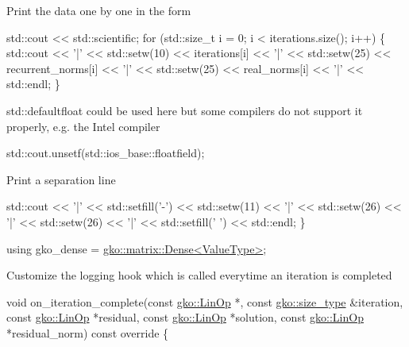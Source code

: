 Print the data one by one in the form


\begin{DoxyCode}
std::cout << std::scientific;
\textcolor{keywordflow}{for} (std::size\_t i = 0; i < iterations.size(); i++) \{
    std::cout << \textcolor{charliteral}{'|'} << std::setw(10) << iterations[i] << \textcolor{charliteral}{'|'}
              << std::setw(25) << recurrent\_norms[i] << \textcolor{charliteral}{'|'}
              << std::setw(25) << real\_norms[i] << \textcolor{charliteral}{'|'} << std::endl;
\}
\end{DoxyCode}


std\+::defaultfloat could be used here but some compilers do not support it properly, e.\+g. the Intel compiler


\begin{DoxyCode}
std::cout.unsetf(std::ios\_base::floatfield);
\end{DoxyCode}


Print a separation line


\begin{DoxyCode}
    std::cout << \textcolor{charliteral}{'|'} << std::setfill(\textcolor{charliteral}{'-'}) << std::setw(11) << \textcolor{charliteral}{'|'}
              << std::setw(26) << \textcolor{charliteral}{'|'} << std::setw(26) << \textcolor{charliteral}{'|'}
              << std::setfill(\textcolor{charliteral}{' '}) << std::endl;
\}

\textcolor{keyword}{using} gko\_dense = \hyperlink{classgko_1_1matrix_1_1Dense}{gko::matrix::Dense<ValueType>};
\end{DoxyCode}


Customize the logging hook which is called everytime an iteration is completed


\begin{DoxyCode}
\textcolor{keywordtype}{void} on\_iteration\_complete(\textcolor{keyword}{const} \hyperlink{classgko_1_1LinOp}{gko::LinOp} *,
                           \textcolor{keyword}{const} \hyperlink{namespacegko_a6e5c95df0ae4e47aab2f604a22d98ee7}{gko::size\_type} &iteration,
                           \textcolor{keyword}{const} \hyperlink{classgko_1_1LinOp}{gko::LinOp} *residual,
                           \textcolor{keyword}{const} \hyperlink{classgko_1_1LinOp}{gko::LinOp} *solution,
                           \textcolor{keyword}{const} \hyperlink{classgko_1_1LinOp}{gko::LinOp} *residual\_norm)\textcolor{keyword}{ const override}
\textcolor{keyword}{}\{
\end{DoxyCode}


